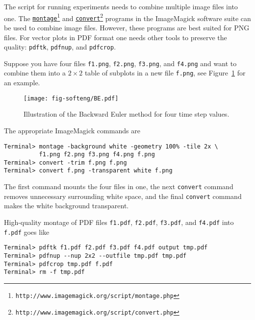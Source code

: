 \documentclass[graybox,sectrefs,envcountresetchap,open=right,final]{svmonodo}
\begin{document}
The script for running experiments needs to combine multiple image
files into one. The
\href{{http://www.imagemagick.org/script/montage.php}}{\nolinkurl{montage}\footnote{\texttt{http://www.imagemagick.org/script/montage.php}}}
and
\href{{http://www.imagemagick.org/script/convert.php}}{\nolinkurl{convert}\footnote{\texttt{http://www.imagemagick.org/script/convert.php}}} programs in
the ImageMagick software suite
can be used to combine image files.
However, these programs are best suited for
PNG files. For vector plots in PDF format one needs other tools
to preserve the quality: \texttt{pdftk}, \texttt{pdfnup}, and \texttt{pdfcrop}.

Suppose you have four files \texttt{f1.png}, \texttt{f2.png}, \texttt{f3.png}, and \texttt{f4.png}
and want to combine them into a $2\times 2$ table of subplots in a new
file \texttt{f.png}, see
Figure~\ref{softeng1:experiments:fig:BE4a} for an example.

\begin{figure}[!ht]  %
  \centerline{\texttt{[image: fig-softeng/BE.pdf]}}
  \caption{
  Illustration of the Backward Euler method for four time step values. \label{softeng1:experiments:fig:BE4a}
  }
\end{figure}

The appropriate ImageMagick commands are






\begin{Verbatim}[frame=lines,label=\fbox{{\tiny Terminal}},framesep=2.5mm,framerule=0.7pt,fontsize=\fontsize{9pt}{9pt}]
Terminal> montage -background white -geometry 100% -tile 2x \ 
          f1.png f2.png f3.png f4.png f.png
Terminal> convert -trim f.png f.png
Terminal> convert f.png -transparent white f.png

\end{Verbatim}

The first command mounts the four files in one, the next \texttt{convert} command
removes unnecessary surrounding white space, and the final \texttt{convert} command
makes the white background transparent.

High-quality montage of PDF files \texttt{f1.pdf},
\texttt{f2.pdf}, \texttt{f3.pdf}, and \texttt{f4.pdf} into \texttt{f.pdf} goes like






\begin{Verbatim}[frame=lines,label=\fbox{{\tiny Terminal}},framesep=2.5mm,framerule=0.7pt,fontsize=\fontsize{9pt}{9pt}]
Terminal> pdftk f1.pdf f2.pdf f3.pdf f4.pdf output tmp.pdf
Terminal> pdfnup --nup 2x2 --outfile tmp.pdf tmp.pdf
Terminal> pdfcrop tmp.pdf f.pdf
Terminal> rm -f tmp.pdf

\end{Verbatim}
\end{document}
